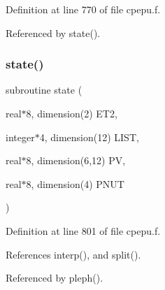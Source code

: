 Definition at line 770 of file cpepu.\+f.



Referenced by state().

\mbox{\label{cpepu_8f_aef334eeeabb72d23bbc1583a80460182}} 
\subsubsection{\texorpdfstring{state()}{state()}}
{\footnotesize\ttfamily subroutine state (\begin{DoxyParamCaption}\item[{real$\ast$8, dimension(2)}]{E\+T2,  }\item[{integer$\ast$4, dimension(12)}]{L\+I\+ST,  }\item[{real$\ast$8, dimension(6,12)}]{PV,  }\item[{real$\ast$8, dimension(4)}]{P\+N\+UT }\end{DoxyParamCaption})}



Definition at line 801 of file cpepu.\+f.



References interp(), and split().



Referenced by pleph().


